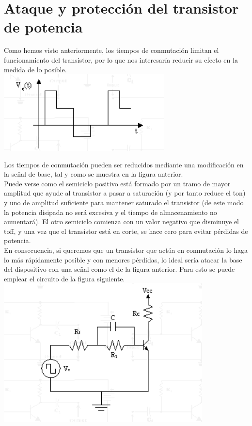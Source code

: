 \documentclass[10pt,a4paper]{article}
\begin{document}
\section{Ataque y protección del transistor de potencia}
Como hemos visto anteriormente, los tiempos de conmutación limitan el funcionamiento del transistor, por lo que nos interesaría reducir su efecto en la medida de lo posible.\\
\centering
\includegraphics[scale=1]{s.png}\\
\raggedright
Los tiempos de conmutación pueden ser reducidos mediante una modificación en la señal de base, tal y como se muestra en la figura anterior.\\
Puede verse como el semiciclo positivo está formado por un tramo de mayor amplitud que ayude al transistor a pasar a saturación (y por tanto reduce el ton) y uno de amplitud suficiente para mantener saturado el transistor (de este modo la potencia disipada no será excesiva y el tiempo de almacenamiento no aumentará). El otro semiciclo comienza con un valor negativo que disminuye el toff, y una vez que el transistor está en corte, se hace cero para evitar pérdidas de potencia.\\
\bigskip
En consecuencia, si queremos que un transistor que actúa en conmutación lo haga lo más rápidamente posible y con menores pérdidas, lo ideal sería atacar la base del dispositivo con una señal como el de la figura anterior. Para esto se puede emplear el circuito de la figura siguiente.\\
\centering
\includegraphics[scale=1]{cir.png}\\
\end{document}
